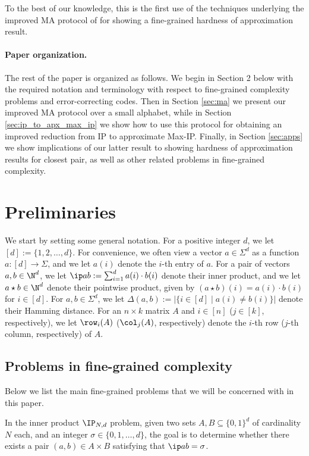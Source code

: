 \documentclass[11pt]{article}
\begin{document}
To the best of our knowledge, this is the first use of the techniques underlying the improved MA protocol of \cite{Che18} for showing a fine-grained hardness of approximation result.

\paragraph{Paper organization.} The rest of the paper is organized as follows. We begin in Section 2 below with the required notation and terminology with respect to fine-grained complexity problems and error-correcting codes. Then in Section \ref{sec:ma} we present our improved MA protocol over a small alphabet, while in Section
\ref{sec:ip_to_apx_max_ip} we show how to use this protocol for obtaining an improved reduction from IP to approximate Max-IP. Finally, in Section \ref{sec:apps} we show implications of our latter result to showing hardness of approximation results for closest pair, as well as other related problems in fine-grained complexity.

\section{Preliminaries}\label{sec:prelim}


We start by setting some general notation.
For a positive integer $d$, we let $[d]:=\{1,2, \ldots, d\}$.  For convenience, we often view a vector $a \in \Sigma^d$ as a function $a:[d] \to \Sigma$, and we let $a(i)$ denote the $i$-th entry of $a$. 
For a pair of vectors $a,b \in \N^d$, we let $\ip a b := \sum_{i=1}^d a(i) \cdot b(i)$ denote their inner product,  and we let $a \star b \in \N^d$ denote their pointwise product, given by $(a \star b)(i) = a(i) \cdot b(i)$ for $i \in [d]$. For $a,b \in \Sigma^d$, we let $\Delta(a,b):=|\{i \in [d] \mid a(i) \neq b(i)\}|$ denote their \textsf{Hamming distance}.
For an $n \times k$ matrix $A$ and $i\in [n]$ ($j \in [k]$, respectively),
we let $\row_i(A)$ ($\col_j(A)$, respectively) denote the $i$-th row ($j$-th column, respectively) of $A$.

\subsection{Problems in fine-grained complexity}

Below we list the main fine-grained problems that we will be concerned with in this paper.


\begin{defn} In  the \textsf{ inner product $\IP_{N,d}$ problem},
given two sets $A, B\subseteq\{0,1\}^d$
of cardinality $N$ each, and an integer $\sigma \in \{0,1,\ldots, d\}$, the goal is to determine whether there exists a pair $(a,b)\in A\times B$ satisfying that $\ip a b = \sigma$.
\end{defn}
\end{document}
